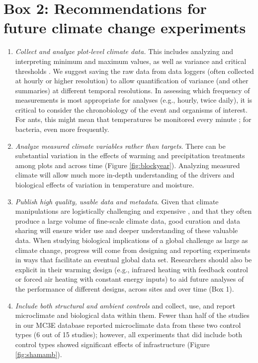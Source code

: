 \documentclass{article}
\begin{document}
\section* {Box 2: Recommendations for future climate change experiments} 
\begin{enumerate}
\item\textit{Collect and analyze plot-level climate data.} This includes analyzing and interpreting minimum and maximum values, as well as variance and critical thresholds \citep[e.g., the number and duration of freeze-thaw events and accumulated chilling hours,][]{mcdaniel2014,vasseur2014}. We suggest saving the raw data from data loggers (often collected at hourly or higher resolution) to allow quantification of variance (and other summaries) at different temporal resolutions. In assessing which frequency of measurements is most appropriate for analyses (e.g., hourly, twice daily), it is critical to consider the chronobiology of the event and organisms of interest. For ants, this might mean that temperatures be monitored every minute \citep{shavit2017}; for bacteria, even more frequently. 
\item\textit{Analyze measured climate variables rather than targets}. There can be substantial variation in the effects of warming and precipitation treatments among plots and across time (Figure \ref{fig:blockyear}). Analyzing measured climate will allow much more in-depth understanding of the drivers and biological effects of variation in temperature and moisture.
\item\textit{Publish high quality, usable data and metadata}. Given that climate manipulations are logistically challenging and expensive \citep{aronson2009}, and that they often produce a large volume of fine-scale climate data, good curation and data sharing will ensure wider use and deeper understanding of these valuable data. When studying biological implications of a global challenge as large as climate change, progress will come from designing and reporting experiments in ways that facilitate an eventual global data set. Researchers should also be explicit in their warming design (e.g., infrared heating with feedback control or forced air heating with constant energy inputs) to aid future analyses of the performance of different designs, across sites and over time (Box 1).   
\item\textit{Include both structural and ambient controls} and collect, use, and report microclimate and biological data within them. Fewer than half of the studies in our MC3E database reported microclimate data from these two control types (6 out of 15 studies); however, all experiments that did include both control types showed significant effects of infrastructure (Figure \ref{fig:shamamb}).

\end{enumerate}
\end{document}
